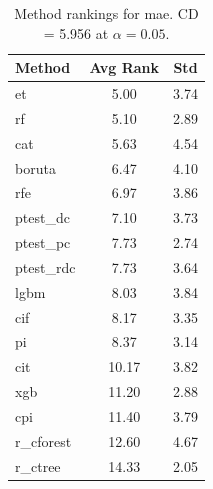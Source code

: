 \begin{table}[h]
\centering
\caption{Method rankings for mae. CD = 5.956 at $\alpha=0.05$.}
\label{tab:ranks_mae}
\begin{tabular}{lcc}
\toprule
Method & Avg Rank & Std \\
\midrule
et & 5.00 & 3.74 \\
rf & 5.10 & 2.89 \\
cat & 5.63 & 4.54 \\
boruta & 6.47 & 4.10 \\
rfe & 6.97 & 3.86 \\
ptest_dc & 7.10 & 3.73 \\
ptest_pc & 7.73 & 2.74 \\
ptest_rdc & 7.73 & 3.64 \\
lgbm & 8.03 & 3.84 \\
cif & 8.17 & 3.35 \\
pi & 8.37 & 3.14 \\
cit & 10.17 & 3.82 \\
xgb & 11.20 & 2.88 \\
cpi & 11.40 & 3.79 \\
r_cforest & 12.60 & 4.67 \\
r_ctree & 14.33 & 2.05 \\
\bottomrule
\end{tabular}
\end{table}